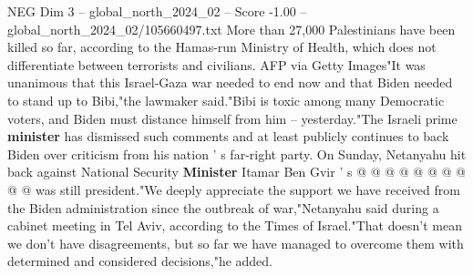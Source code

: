 \begin{textsample}{NEG Dim 3 – global\_north\_2024\_02 – Score -1.00 – global\_north\_2024\_02/105660497.txt}
More than 27,000 Palestinians have been killed so far, according to the Hamas-run Ministry of Health, which does not differentiate between terrorists and civilians.
AFP via Getty Images"It was unanimous that this Israel-Gaza war needed to end now and that Biden needed to stand up to Bibi,"the lawmaker said."Bibi is toxic among many Democratic voters, and Biden must distance himself from him -- yesterday."The Israeli prime \textbf{minister} has dismissed such comments and at least publicly continues to back Biden over criticism from his nation ' s far-right party.
On Sunday, Netanyahu hit back against National Security \textbf{Minister} Itamar Ben Gvir ' s @ @ @ @ @ @ @ @ @ @ was still president."We deeply appreciate the support we have received from the Biden administration since the outbreak of war,"Netanyahu said during a cabinet meeting in Tel Aviv, according to the Times of Israel."That doesn't mean we don't have disagreements, but so far we have managed to overcome them with determined and considered decisions,"he added.

\end{textsample}
